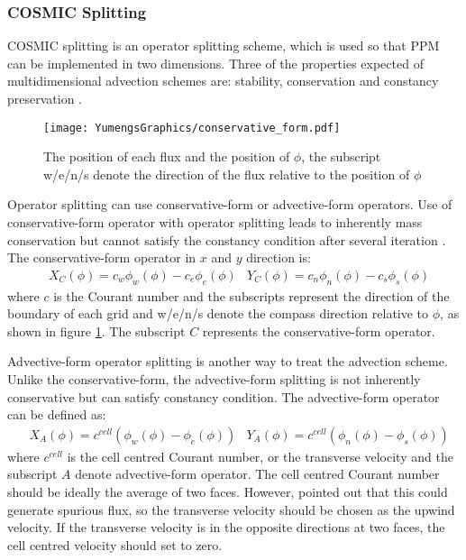 \subsubsection{COSMIC Splitting}
\label{sec:COSMIC}
COSMIC splitting is an operator splitting scheme, which is used so that PPM can be implemented in two dimensions. Three of the properties expected of multidimensional advection schemes are: stability, conservation and constancy preservation \citep{Lin1996}.
\begin{figure}
\vspace{-10pt}
\centering
\texttt{[image: YumengsGraphics/conservative\_form.pdf]}
\vspace{-10pt}
\caption{The position of each flux and the position of $\phi$, the subscript w/e/n/s denote the direction of the flux relative to the position of $\phi$ \label{fig:2.2}}
\end{figure}
Operator splitting can use conservative-form or advective-form operators. Use of conservative-form operator with operator splitting leads to inherently mass conservation but cannot satisfy the constancy condition after several iteration \citep{Leonard1996}. The conservative-form operator in $x$ and $y$ direction is:
\begin{eqnarray}  \label{eq:2.13}
&X_{\scriptscriptstyle C}(\phi ) = c_{w}\phi_w(\phi )-c_e\phi_e(\phi ) 
&Y_{\scriptscriptstyle C}(\phi ) = c_{n}\phi_n(\phi )-c_s\phi_s(\phi )
\end{eqnarray}
where $c$ is the Courant number and the subscripts represent the direction of the boundary of each grid and w/e/n/s denote the compass direction relative to $\phi$, as shown in figure \ref{fig:2.2}. The subscript $C$ represents the conservative-form operator.

Advective-form operator splitting is another way to treat the advection scheme. Unlike the conservative-form, the advective-form splitting is not inherently conservative but can satisfy constancy condition. The advective-form operator \citep{Leonard1996} can be defined as:
\begin{eqnarray} \label{eq:2.16}
&X_{\scriptscriptstyle A}(\phi ) = c^{cell}(\phi_w(\phi )-\phi_e(\phi )) 
&Y_{\scriptscriptstyle A}(\phi ) = c^{cell}(\phi_n(\phi )-\phi_s(\phi ))
\end{eqnarray}
where $c^{cell}$ is the cell centred Courant number, or the transverse velocity and the subscript $A$ denote advective-form operator. The cell centred Courant number should be ideally the average of two faces. However, \citep{Lin1996} pointed out that this could generate spurious flux, so the transverse velocity should be chosen as the upwind velocity. If the transverse velocity is in the opposite directions at two faces, the cell centred velocity should set to zero.

